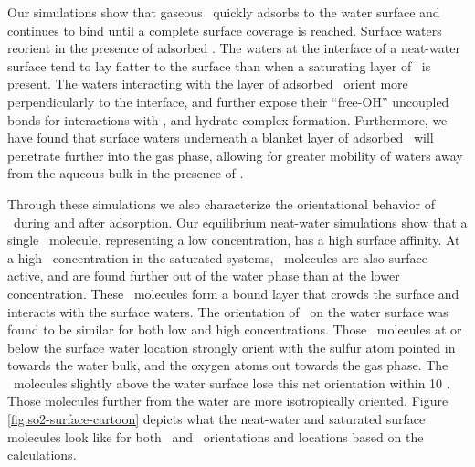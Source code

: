 Our simulations show that gaseous \suldiox~quickly adsorbs to the water surface and continues to bind until a complete surface coverage is reached. Surface waters reorient in the presence of adsorbed \suldiox. The waters at the interface of a neat-water surface tend to lay flatter to the surface than when a saturating layer of \suldiox~is present. The waters interacting with the layer of adsorbed \suldiox~orient more perpendicularly to the interface, and further expose their ``free-OH'' uncoupled bonds for interactions with \suldiox, and hydrate complex formation. Furthermore, we have found that surface waters underneath a blanket layer of adsorbed \suldiox~will penetrate further into the gas phase, allowing for greater mobility of waters away from the aqueous bulk in the presence of \suldiox.

Through these simulations we also characterize the orientational behavior of \suldiox~during and after adsorption. Our equilibrium neat-water simulations show that a single \suldiox~molecule, representing a low concentration, has a high surface affinity. At a high \suldiox~concentration in the saturated systems, \suldiox~molecules are also surface active, and are found further out of the water phase than at the lower concentration. These \suldiox~molecules form a bound layer that crowds the surface and interacts with the surface waters. The orientation of \suldiox~on the water surface was found to be similar for both low and high concentrations. Those \suldiox~molecules at or below the surface water location strongly orient with the sulfur atom pointed in towards the water bulk, and the oxygen atoms out towards the gas phase. The \suldiox~molecules slightly above the water surface lose this net orientation within 10 \angs. Those  molecules further from the water are more isotropically oriented. Figure \ref{fig:so2-surface-cartoon} depicts what the neat-water and saturated surface molecules look like for both \suldiox~and \wat~orientations and locations based on the calculations.


